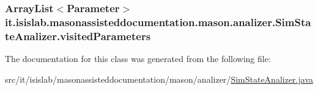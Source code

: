 \hypertarget{classit_1_1isislab_1_1masonassisteddocumentation_1_1mason_1_1analizer_1_1_sim_state_analizer_af04494d03ea6d22a94201b5c08706b67}{
\subsubsection[{visited\-Parameters}]{\setlength{\rightskip}{0pt plus 5cm}Array\-List$<${\bf Parameter}$>$ it.\-isislab.\-masonassisteddocumentation.\-mason.\-analizer.\-Sim\-State\-Analizer.\-visited\-Parameters\hspace{0.3cm}{\ttfamily [private]}}}\label{classit_1_1isislab_1_1masonassisteddocumentation_1_1mason_1_1analizer_1_1_sim_state_analizer_af04494d03ea6d22a94201b5c08706b67}


The documentation for this class was generated from the following file\-:\begin{DoxyCompactItemize}
\item 
src/it/isislab/masonassisteddocumentation/mason/analizer/\hyperlink{_sim_state_analizer_8java}{Sim\-State\-Analizer.\-java}\end{DoxyCompactItemize}
